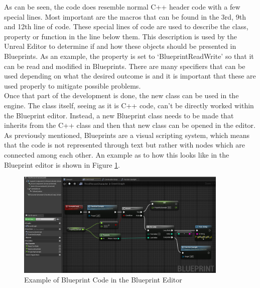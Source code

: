 As can be seen, the code does resemble normal C++ header code with a few special lines. Most important are the macros that can be found in the 3rd, 9th and 12th line of code. These special lines of code are used to describe the class, property or function in the line below them. This description is used by the Unreal Editor to determine if and how these objects should be presented in Blueprints. As an example, the property is set to `BlueprintReadWrite' so that it can be read and modified in Blueprints. There are many specifiers that can be used depending on what the desired outcome is and it is important that these are used properly to mitigate possible problems.\\
 
Once that part of the development is done, the new class can be used in the engine. The class itself, seeing as it is C++ code, can't be directly worked within the Blueprint editor. Instead, a new Blueprint class needs to be made that inherits from the C++ class and then that new class can be opened in the editor.\\
As previously mentioned, Blueprints are a visual scripting system, which means that the code is not represented through text but rather with nodes which are connected among each other. An example as to how this looks like in the Blueprint editor is shown in Figure \ref{fig:BlueprintExample}.

\begin{figure}[htpb]
	\centering
	\includegraphics[width=0.9\textwidth]{fig/BlueprintExample.png}
	\caption[Example Blueprint Code]{Example of Blueprint Code in the Blueprint Editor\protect}
	\label{fig:BlueprintExample}
\end{figure}

